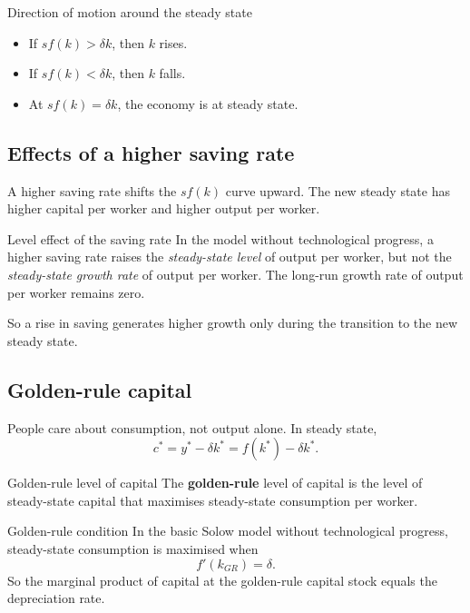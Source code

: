 \documentclass[12pt]{article}
\begin{document}
\begin{theorem}{Direction of motion around the steady state}{}
\begin{itemize}[leftmargin=1.5em]
\item If \(sf(k)>\delta k\), then \(k\) rises.
\item If \(sf(k)<\delta k\), then \(k\) falls.
\item At \(sf(k)=\delta k\), the economy is at steady state.
\end{itemize}
\end{theorem}

\subsection{Effects of a higher saving rate}

A higher saving rate shifts the \(sf(k)\) curve upward. The new steady state has higher capital per worker and higher output per worker.

\begin{theorem}{Level effect of the saving rate}{}
In the model without technological progress, a higher saving rate raises the \emph{steady-state level} of output per worker, but not the \emph{steady-state growth rate} of output per worker. The long-run growth rate of output per worker remains zero.
\end{theorem}

So a rise in saving generates higher growth only during the transition to the new steady state.

\newpage
\subsection{Golden-rule capital}

People care about consumption, not output alone. In steady state,
\[
c^*=y^*-\delta k^*=f(k^*)-\delta k^*.
\]

\begin{definition}{Golden-rule level of capital}{}
The \textbf{golden-rule} level of capital is the level of steady-state capital that maximises steady-state consumption per worker.
\end{definition}

\begin{theorem}{Golden-rule condition}{}
In the basic Solow model without technological progress, steady-state consumption is maximised when
\[
f'(k_{GR})=\delta.
\]
So the marginal product of capital at the golden-rule capital stock equals the depreciation rate.
\end{theorem}
\end{document}
